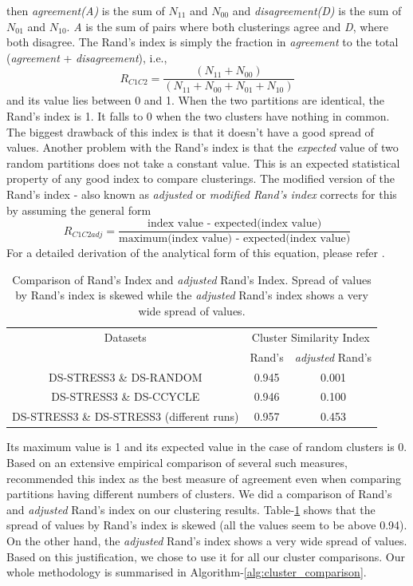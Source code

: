 then \textit{agreement(A)} is the sum of $N_{11}$ and $N_{00}$ and \textit{disagreement(D)} is the sum of $N_{01}$ and $N_{10}$. \textit{A} is the sum of pairs where both clusterings agree and \textit{D}, where both disagree. The Rand's index is simply the fraction in \textit{agreement} to the total (\textit{agreement} + \textit{disagreement}), i.e.,
\[
R_{C1C2}=\frac{(N_{11} + N_{00})}{(N_{11} + N_{00}+N_{01} + N_{10})}
\]
and its value lies between 0 and 1. When the two partitions are identical, the Rand's index is 1. It falls to 0 when the two clusters have nothing in common. The biggest drawback of this index is that it doesn't have a good spread of values. Another problem with the Rand's index is that the \textit{expected} value of two random partitions does not take a constant value. This is an expected statistical property of any good index to compare clusterings. The modified version of the Rand's index - also known as \textit{adjusted} or \textit{modified Rand's index} corrects for this by assuming the general form
\[
R_{C1C2adj}=\frac{\text{index value - expected(index value)}}{\text{maximum(index value) - expected(index value)}}
\]
For a detailed derivation of the analytical form of this equation, please refer \citet{hubert85comparing}. 
\begin{table}[t]
\centering
\begin{tabular}{|c|c|c|}
\hline
Datasets & \multicolumn{2}{|c|}{Cluster Similarity Index} \\
& Rand's &  \textit{adjusted} Rand's \\
\hline
DS-STRESS3 \& DS-RANDOM & 0.945 & 0.001 \\
DS-STRESS3 \& DS-CCYCLE & 0.946 & 0.100 \\ 
DS-STRESS3 \& DS-STRESS3 (different runs) & 0.957 & 0.453 \\
\hline 
\end{tabular}
\caption[Comparison of Rand's Index and \textit{adjusted} Rand's Index]{Comparison of Rand's Index and \textit{adjusted} Rand's Index. Spread of values by Rand's index is skewed while the \textit{adjusted} Rand's index shows a very wide spread of values.}
\label{tab:rand_vs_adjustedrands}
\end{table}

Its maximum value is 1 and its expected value in the case of random clusters is 0. Based on an extensive empirical comparison of several such measures, \citet{milligan85exam} recommended this index as the best measure of agreement even when comparing partitions having different numbers of clusters. 
We did a comparison of Rand's and \textit{adjusted} Rand's index on our clustering results. Table-\ref{tab:rand_vs_adjustedrands} shows that the spread of values by Rand's index is skewed (all the values seem to be above 0.94). On the other hand, the \textit{adjusted} Rand's index shows a very wide spread of values. Based on this justification, we chose to use it for all our cluster comparisons. Our whole methodology is summarised in Algorithm-\ref{alg:cluster_comparison}.

